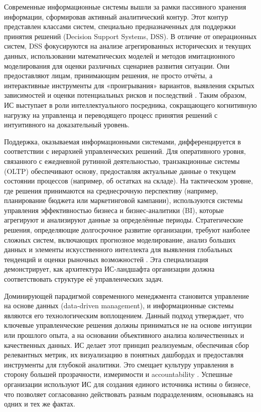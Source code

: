 \documentclass{SibFU-docs}
\begin{document}
Современные информационные системы вышли за рамки пассивного хранения информации, сформировав активный аналитический контур. Этот контур представлен классами систем, специально предназначенных для поддержки принятия решений (Decision Support Systems, DSS). В отличие от операционных систем, DSS фокусируются на анализе агрегированных исторических и текущих данных, использовании математических моделей и методов имитационного моделирования для оценки различных сценариев развития ситуации. Они предоставляют лицам, принимающим решения, не просто отчёты, а интерактивные инструменты для «проигрывания» вариантов, выявления скрытых зависимостей и оценки потенциальных рисков и последствий \cite{dss_overview}. Таким образом, ИС выступает в роли интеллектуального посредника, сокращающего когнитивную нагрузку на управленца и переводящего процесс принятия решений с интуитивного на доказательный уровень.


Поддержка, оказываемая информационными системами, дифференцируется в соответствии с иерархией управленческих решений. Для оперативного уровня, связанного с ежедневной рутинной деятельностью, транзакционные системы (OLTP) обеспечивают основу, предоставляя актуальные данные о текущем состоянии процессов (например, об остатках на складе). На тактическом уровне, где решения принимаются на среднесрочную перспективу (например, планирование бюджета или маркетинговой кампании), используются системы управления эффективностью бизнеса и бизнес-аналитики (BI), которые агрегируют и анализируют данные за определённые периоды. Стратегические решения, определяющие долгосрочное развитие организации, требуют наиболее сложных систем, включающих прогнозное моделирование, анализ больших данных и элементы искусственного интеллекта для выявления глобальных тенденций и оценки рыночных возможностей \cite{dss_overview}. Эта специализация демонстрирует, как архитектура ИС-ландшафта организации должна соответствовать структуре её управленческих задач.


Доминирующей парадигмой современного менеджмента становится управление на основе данных (data-driven management), и информационные системы являются его технологическим воплощением. Данный подход утверждает, что ключевые управленческие решения должны приниматься не на основе интуиции или прошлого опыта, а на основании объективного анализа количественных и качественных данных. ИС делает этот принцип реализуемым, обеспечивая сбор релевантных метрик, их визуализацию в понятных дашбордах и предоставляя инструменты для глубокой аналитики. Это смещает культуру управления в сторону большей прозрачности, измеримости и accountability \cite{data_driven}. Успешные организации используют ИС для создания единого источника истины о бизнесе, что позволяет согласованно действовать разным подразделениям, основываясь на одних и тех же фактах.
\end{document}
